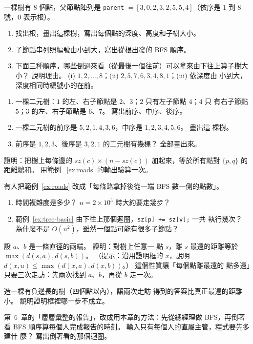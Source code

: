 \begin{drills}[label=drills:ch13]
\item 一棵樹有 $8$ 個點，父節點陣列是 \texttt{parent} $= [3, 0, 2, 3, 2, 5, 5,
4]$（依序是 $1$ 到 $8$ 號，$0$ 表示根）。
\begin{enumerate}
\item 找出根，畫出這棵樹，寫出每個點的深度、高度和子樹大小。
\item 子節點串列照編號由小到大，寫出從根出發的 BFS 順序。
\item 下面三種順序，哪些倒過來看（從最後一個往前）可以拿來由下往上算子樹大小？
說明理由。 (i) $1, 2, \ldots, 8$；(ii) $2, 5, 7, 6, 3, 4, 8, 1$；(iii) 依深度由
小到大，深度相同時編號小的在前。
\end{enumerate}

\item \label{drill:tree-binary}
\begin{enumerate}
\item 一棵二元樹：$1$ 的左、右子節點是 $2$、$3$；$2$ 只有左子節點 $4$；$4$ 只
有右子節點 $5$；$3$ 的左、右子節點是 $6$、$7$。 寫出前序、中序、後序。
\item 一棵二元樹的前序是 $5, 2, 1, 4, 3, 6$，中序是 $1, 2, 3, 4, 5, 6$。 畫出這
棵樹。
\item 前序是 $1, 2, 3$、後序是 $3, 2, 1$ 的二元樹有幾棵？ 全部畫出來。
\end{enumerate}

\item \label{drill:tree-pairsum} 證明：把樹上每條邊的 $\mathit{sz}(c) \times (n
- \mathit{sz}(c))$ 加起來，等於所有點對 $\{p, q\}$ 的距離總和。 用範例
~\ref{ex:roads} 的輸出驗算一次。

\item 有人把範例~\ref{ex:roads} 改成「每條路拿掉後從一端 BFS 數一側的點數」。
\begin{enumerate}
\item 時間複雜度是多少？ $n = 2 \times 10^5$ 時大約要走幾步？
\item 範例~\ref{ex:tree-basic} 由下往上那個迴圈，\texttt{sz[p] += sz[v];} 一共
執行幾次？ 為什麼不是 $O(n^2)$，雖然一個點可能有很多子節點？
\end{enumerate}

\item \label{drill:tree-ecc} 設 $a$、$b$ 是一條直徑的兩端。 證明：對樹上任意一
點 $s$，離 $s$ 最遠的距離等於 $\max(d(s, a), d(s, b))$。 （提示：沿用證明框的
$x$，說明 $d(x, u) \le \max(d(x, a), d(x, b))$。） 這個性質讓「每個點離最遠的
點多遠」只要三次走訪：先兩次找到 $a$、$b$，再從 $b$ 走一次。

\item \label{drill:tree-negative} 造一棵有負邊長的樹（四個點以內），讓兩次走訪
得到的答案比真正最遠的距離小。 說明證明框裡哪一步不成立。

\item 第~6~章的「層層彙整的報告」，改成用本章的方法：先從總經理做 BFS，再倒著
看 BFS 順序算每個人完成報告的時刻。 輸入只有每個人的直屬主管，程式要先多建什
麼？ 寫出倒著看的那個迴圈。
\end{drills}

